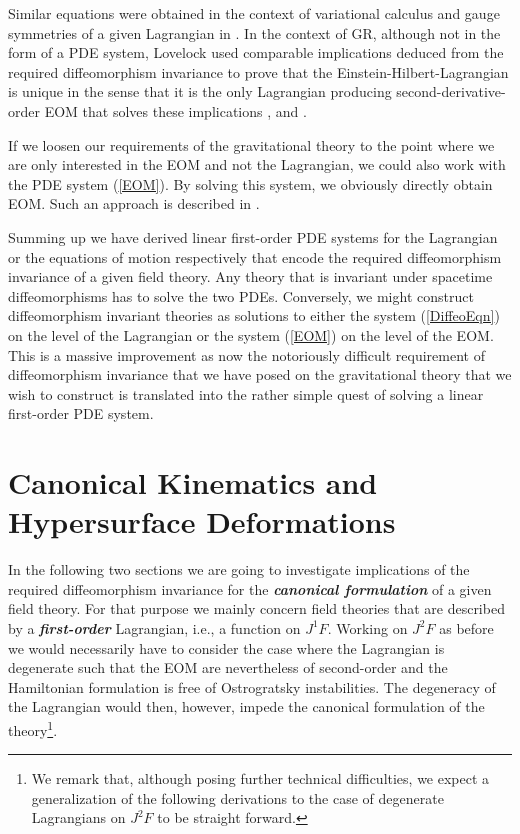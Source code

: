 Similar equations were obtained in the context of variational calculus and gauge symmetries of a given Lagrangian in \cite{article}. In the context of GR, although not in the form of a PDE system, Lovelock used comparable implications deduced from the required diffeomorphism invariance to prove that the Einstein-Hilbert-Lagrangian is unique in the sense that it is the only Lagrangian producing second-derivative-order EOM that solves these implications \cite{Lovelock1969}, \cite{doi:10.1063/1.1666069} and \cite{doi:10.1063/1.1665613}. 

If we loosen our requirements of the gravitational theory to the point where we are only interested in the EOM and not the Lagrangian, we could also work with the PDE system (\ref{EOM}). By solving this system, we obviously directly obtain EOM. Such an approach is described in \cite{TobiR}.

Summing up we have derived linear first-order PDE systems for the Lagrangian or the equations of motion respectively that encode the required diffeomorphism invariance of a given field theory. Any theory that is invariant under spacetime diffeomorphisms has to solve the two PDEs. Conversely, we might construct diffeomorphism invariant theories as solutions to either the system (\ref{DiffeoEqn}) on the level of the Lagrangian or the system (\ref{EOM}) on the level of the EOM. This is a massive improvement as now the notoriously difficult requirement of diffeomorphism invariance that we have posed on the gravitational theory that we wish to construct is translated into the rather simple quest of solving a linear first-order PDE system.  



\section{Canonical Kinematics and Hypersurface Deformations}
In the following two sections we are going to investigate implications of the required diffeomorphism invariance for the \textit{\textbf{canonical formulation}} of a given field theory. For that purpose we mainly concern field theories that are described by a \textit{\textbf{first-order}} Lagrangian, i.e., a function on $J^1F$. Working on $J^2F$ as before we would necessarily have to consider the case where the Lagrangian is degenerate such that the EOM are nevertheless of second-order and the Hamiltonian formulation is free of Ostrogratsky instabilities. The degeneracy of the Lagrangian would then, however, impede the canonical formulation of the theory\footnote{We remark that, although posing further technical difficulties, we expect a generalization of the following derivations to the case of degenerate Lagrangians on $J^2F$ to be straight forward.}.

